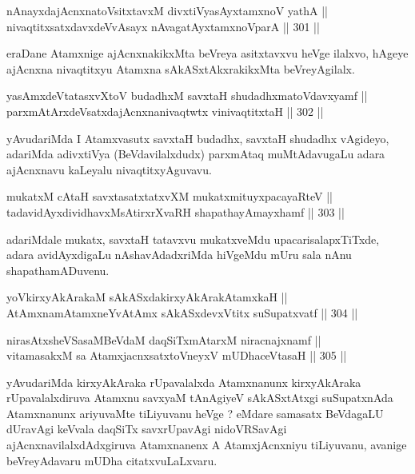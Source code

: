 \begin{shl}
nAnayxdajAcnxnatoV\s sitxtavxM divxtiVyasAyx\s \s tamxnoV yathA || \\
nivaqtitxsatxdavxdeVvAsayx nAvagatAyxtamxnoV\s parA \hfill || 301 ||  
\end{shl}

\begin{artha}
eraDane Atamxnige ajAcnxnakikxMta beVreya asitxtavxvu heVge ilalxvo, hAgeye ajAcnxna nivaqtitxyu Atamxna sAkASxtAkxrakikxMta beVreyAgilalx.
\end{artha}

\begin{shl}
yasAmxdeVtatasxvXtoV budadhxM savxtaH shudadhxmatoV\s davxyamf || \\
parxmAtArxdeVsatxdajAcnxnanivaqtwtx vinivaqtitxtaH \hfill || 302 || 
\end{shl}

\begin{artha}
yAvudariMda I Atamxvasutx savxtaH budadhx, savxtaH shudadhx vAgideyo,
adariMda adivxtiVya (BeVdavilalxdudx) parxmAtaq muMtAdavugaLu adara
ajAcnxnavu kaLeyalu nivaqtitxyAguvavu.
\end{artha}

\begin{shl}
mukatxM cAtaH savxtasatxtatxvXM mukatxmituyxpacayaRteV || \\
tadavidAyxdividhavxMsAtirxrXvaRH shapathayAmayxhamf \hfill || 303 ||  
\end{shl}

\begin{artha}
adariMdale mukatx, savxtaH tatavxvu mukatxveMdu upacarisalapxTiTxde,
adara avidAyxdigaLu nAshavAdadxriMda hiVgeMdu mUru sala nAnu
shapathamADuvenu.
\end{artha}

\begin{shl}
yoV\s kirxyAkArakaM sAkASxdakirxyAkArakAtamxkaH || \\
AtAmxnamAtamxneYvA\s \s tAmx sAkASxdevxVtitx suSupatxvatf \hfill || 304 ||  
\end{shl}

\begin{shl}
nirasAtxsheVSasaMBeVdaM daqSiTxmAtarxM niracnajxnamf || \\
vitamasakxM sa AtamxjacnxsatxtoV\s neyxV mUDhaceVtasaH \hfill || 305 ||  
\end{shl}

\begin{artha}
yAvudariMda kirxyAkAraka rUpavalalxda Atamxnanunx kirxyAkAraka
rUpavalalxdiruva Atamxnu savxyaM tAnAgiyeV sAkASxtAtxgi suSupatxnAda
Atamxnanunx ariyuvaMte tiLiyuvanu heVge ? eMdare samasatx BeVdagaLU
dUravAgi keVvala daqSiTx savxrUpavAgi nidoVRSavAgi
ajAcnxnavilalxdAdxgiruva Atamxnanenx A AtamxjAcnxniyu tiLiyuvanu,
avanige beVreyAdavaru mUDha citatxvuLaLxvaru.
\end{artha}

